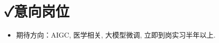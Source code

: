 \documentclass{resume}
\begin{document}
\section{\faCheck 意向岗位}
\begin{itemize}[parsep=0.2ex]
  \item 期待方向：AIGC, 医学相关, 大模型微调, 立即到岗实习半年以上. 
\end{itemize}




\end{document}
